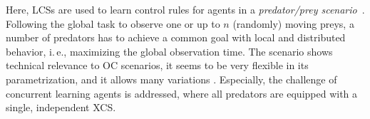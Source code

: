 Here, LCSs are used to learn control rules for agents in a \emph{predator/prey scenario}~\cite{BJD86}. Following the global task to observe one or up to $n$ (randomly) moving preys, a number of predators has to achieve a common goal with local and distributed behavior, i.\,e., maximizing the global observation time. The scenario shows technical relevance to OC scenarios, it seems to be very flexible in its parametrization, and it allows many variations \cite{SV00}. %
Especially, the challenge of concurrent learning agents is addressed, where all predators are equipped with a single, independent XCS.
